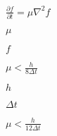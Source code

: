 \documentclass{article}
\begin{document}
$\frac{\partial f}{\partial t} = \mu\nabla^2 f$
\pagebreak

$\mu$
\pagebreak

$f$
\pagebreak

$\mu < \frac{h}{8\Delta t} $
\pagebreak

$h$
\pagebreak

$\Delta t$
\pagebreak

$\mu < \frac{h}{12\Delta t} $
\pagebreak
\end{document}

